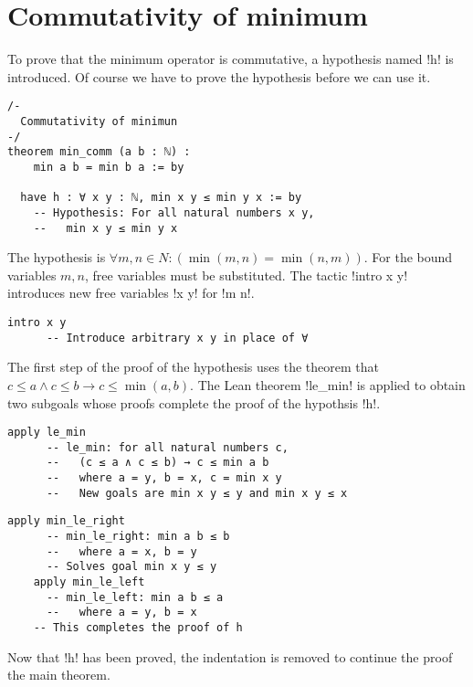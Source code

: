 
\section{Commutativity of minimum}

To prove that the minimum operator is commutative, a hypothesis named !h! is introduced. Of course we have to prove the hypothesis before we can use it.

\begin{Verbatim}
/-
  Commutativity of minimun
-/
theorem min_comm (a b : ℕ) :
    min a b = min b a := by

  have h : ∀ x y : ℕ, min x y ≤ min y x := by
    -- Hypothesis: For all natural numbers x y,
    --   min x y ≤ min y x
\end{Verbatim}


The hypothesis is $\forall m, n \in N : (\min (m,n) = \min (n,m))$. For the bound variables $m, n$, free variables must be substituted. The tactic !intro x y! introduces new free variables !x y! for !m n!.
\begin{Verbatim}[firstnumber=last]
    intro x y
      -- Introduce arbitrary x y in place of ∀
\end{Verbatim}


The first step of the proof of the hypothesis uses the theorem that $c\le a \wedge c \le b \rightarrow c \le \min(a,b)$. The Lean theorem !le_min! is applied to obtain two subgoals whose proofs complete the proof of the hypothsis !h!.

\begin{Verbatim}[firstnumber=last]
    apply le_min
      -- le_min: for all natural numbers c,
      --   (c ≤ a ∧ c ≤ b) → c ≤ min a b
      --   where a = y, b = x, c = min x y
      --   New goals are min x y ≤ y and min x y ≤ x
\end{Verbatim}
\begin{Verbatim}[firstnumber=last]
    apply min_le_right
      -- min_le_right: min a b ≤ b
      --   where a = x, b = y
      -- Solves goal min x y ≤ y
    apply min_le_left
      -- min_le_left: min a b ≤ a
      --   where a = y, b = x
    -- This completes the proof of h
\end{Verbatim}
Now that !h! has been proved, the indentation is removed to continue the proof the main theorem.

